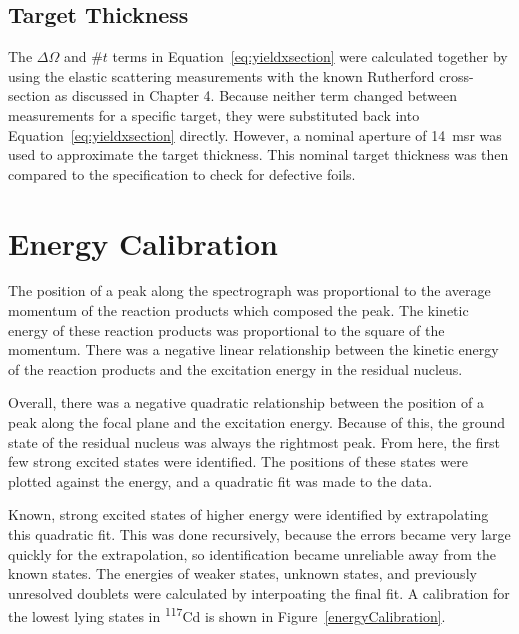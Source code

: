 \subsection{Target Thickness}

The $\Delta\Omega$ and $\#t$ terms in Equation~\ref{eq:yieldxsection} were calculated together by using the elastic scattering measurements with the known Rutherford cross-section as discussed in Chapter 4. Because neither term changed between measurements for a specific target, they were substituted back into Equation~\ref{eq:yieldxsection} directly. However, a nominal aperture of \SI{14}{\milli\steradian} was used to approximate the target thickness. This nominal target thickness was then compared to the specification to check for defective foils.

\section{Energy Calibration}

The position of a peak along the spectrograph was proportional to the average momentum of the reaction products which composed the peak. The kinetic energy of these reaction products was proportional to the square of the momentum. There was a negative linear relationship between the kinetic energy of the reaction products and the excitation energy in the residual nucleus.

Overall, there was a negative quadratic relationship between the position of a peak along the focal plane and the excitation energy. Because of this, the ground state of the residual nucleus was always the rightmost peak. From here, the first few strong excited states were identified. The positions of these states were plotted against the energy, and a quadratic fit was made to the data.

Known, strong excited states of higher energy were identified by extrapolating this quadratic fit. This was done recursively, because the errors became very large quickly for the extrapolation, so identification became unreliable away from the known states. The energies of weaker states, unknown states, and previously unresolved doublets were calculated by interpoating the final fit. A calibration for the lowest lying states in \textsuperscript{117}Cd is shown in Figure~\ref{energyCalibration}.


